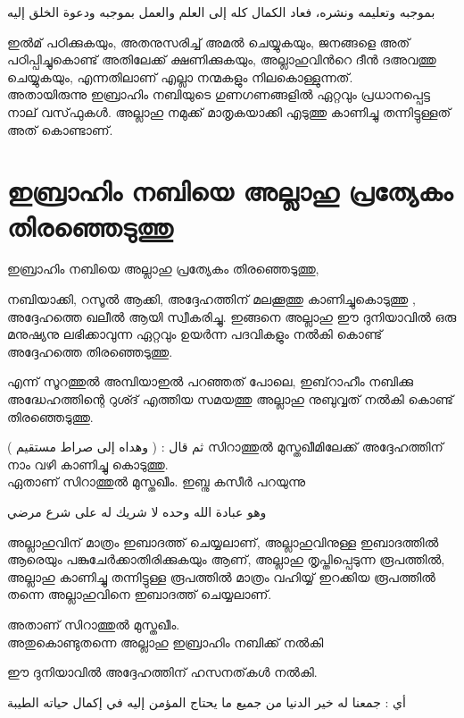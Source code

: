 \textarabic{بموجبه وتعليمه ونشره، فعاد الكمال كله إلى العلم والعمل بموجبه ودعوة الخلق إليه}
 
 

ഇൽമ് പഠിക്കുകയും, അതനുസരിച്ച് അമൽ ചെയ്യുകയും, ജനങ്ങളെ അത് പഠിപ്പിച്ചുകൊണ്ട് അതിലേക്ക് ക്ഷണിക്കുകയും, അല്ലാഹുവിൻറെ ദീൻ ദഅവത്തു ചെയ്യുകയും, എന്നതിലാണ്  എല്ലാ നന്മകളും നിലകൊള്ളുന്നത്. \\


അതായിരുന്നു ഇബ്രാഹിം നബിയുടെ ഗുണഗണങ്ങളിൽ ഏറ്റവും പ്രധാനപ്പെട്ട നാല് വസ്‌ഫുകൾ. 
അല്ലാഹു നമുക്ക് മാതൃകയാക്കി എടുത്തു കാണിച്ചു തന്നിട്ടുള്ളത് അത് കൊണ്ടാണ്. \\

 \section*{\textmalayalam{ഇബ്രാഹിം നബിയെ അല്ലാഹു പ്രത്യേകം തിരഞ്ഞെടുത്തു}}
 
ഇബ്രാഹിം നബിയെ അല്ലാഹു പ്രത്യേകം തിരഞ്ഞെടുത്തു,  

നബിയാക്കി, റസൂൽ ആക്കി, 
അദ്ദേഹത്തിന് മലക്കൂത്തു കാണിച്ചുകൊടുത്തു , അദ്ദേഹത്തെ ഖലീൽ ആയി സ്വീകരിച്ചു. 
ഇങ്ങനെ അല്ലാഹു ഈ ദുനിയാവിൽ ഒരു മനുഷ്യനു ലഭിക്കാവുന്ന ഏറ്റവും ഉയർന്ന പദവികളും നൽകി കൊണ്ട് അദ്ദേഹത്തെ തിരഞ്ഞെടുത്തു. 

    \textarabic{\quranayah[21][51]} 

എന്ന് സൂറത്തുൽ അമ്പിയാഇൽ പറഞ്ഞത് പോലെ, ഇബ്‌റാഹീം നബിക്കു അദ്ധേഹത്തിന്റെ റുശ്ദ് എത്തിയ സമയത്തു അല്ലാഹു നുബുവ്വത് നൽകി കൊണ്ട് തിരഞ്ഞെടുത്തു.

\textarabic{ثم قال : ( وهداه إلى صراط مستقيم )}
സിറാത്തുൽ മുസ്തഖീമിലേക്ക് അദ്ദേഹത്തിന് നാം വഴി കാണിച്ചു കൊടുത്തു. \\

ഏതാണ് സിറാത്തുൽ മുസ്തഖീം. 
ഇബ്നു കസീർ പറയുന്നു


\textarabic{وهو عبادة الله وحده لا شريك له على شرع مرضي }

അല്ലാഹുവിന് മാത്രം ഇബാദത്ത് ചെയ്യലാണ്, അല്ലാഹുവിനുള്ള ഇബാദത്തിൽ ആരെയും പങ്കുചേർക്കാതിരിക്കുകയും ആണ്,  അല്ലാഹു തൃപ്തിപ്പെടുന്ന രൂപത്തിൽ, അല്ലാഹു കാണിച്ചു തന്നിട്ടുള്ള രൂപത്തിൽ മാത്രം വഹിയ്യ് ഇറക്കിയ രൂപത്തിൽ തന്നെ അല്ലാഹുവിനെ ഇബാദത്ത് ചെയ്യലാണ്. 

അതാണ് സിറാത്തുൽ മുസ്തഖീം. \\


അതുകൊണ്ടുതന്നെ അല്ലാഹു ഇബ്രാഹിം നബിക്ക് നൽകി 

    \textarabic{\quranayah[16][122]} 

ഈ ദുനിയാവിൽ അദ്ദേഹത്തിന് ഹസനത്‌കൾ നൽകി. 

\textarabic{أي : جمعنا له خير الدنيا من جميع ما يحتاج المؤمن إليه في إكمال حياته الطيبة}



